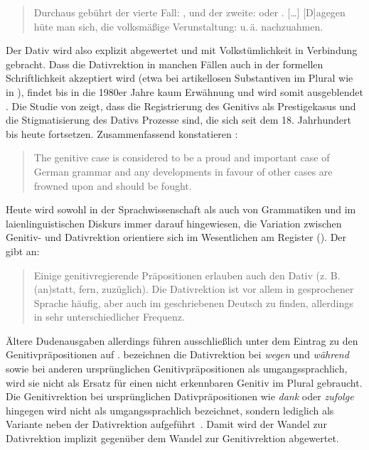\begin{quote} Durchaus gebührt  der vierte Fall: , und \wegen{} der zweite:  oder . […] [D]agegen hüte man sich, die volksmäßige Verunstaltung:  u.\,ä. nachzuahmen. \citep[141]{Matthias.1929} \end{quote}
Der Dativ wird also explizit abgewertet und mit Volkstümlichkeit in Verbindung gebracht. 
Dass die Dativrektion in manchen Fällen auch in der formellen Schriftlichkeit akzeptiert wird (etwa bei artikellosen Substantiven im Plural wie in ), findet bis in die 1980er Jahre kaum Erwähnung und wird somit ausgeblendet \citep[s.][205, 209]{Davies2006}. 
Die Studie von \citet[]{Davies2006} zeigt, dass die Registrierung des Genitivs als Prestigekasus und die Stigmatisierung des Dativs Prozesse sind, die sich seit dem 18. Jahrhundert bis heute fortsetzen. 
Zusammenfassend konstatieren \citeauthor{Davies2006}:\begin{quote}The genitive case is considered to be a proud and important case of German grammar and any developments in favour of other cases are frowned upon and should be fought. \citep[209]{Davies2006}\end{quote}
Heute wird sowohl in der Sprachwissenschaft als auch von Grammatiken und im laienlinguistischen Diskurs immer darauf hingewiesen, die Variation zwischen Genitiv- und Dativrektion orientiere sich im Wesentlichen am Register (\cites[s. etwa][172]{Barbour1998}[135]{Elter2005}[182]{Eisenberg.2013}).  
Der \citeauthor{Duden2022} gibt an: 
\begin{quote}Einige genitivregierende Präpositionen erlauben auch den Dativ (z. B. (an)statt, fern, zuzüglich). Die Dativrektion ist vor allem in gesprochener Sprache häufig, aber auch im geschriebenen Deutsch zu finden, allerdings in sehr unterschiedlicher Frequenz.~\citep[{\S}1450]{Duden2022}\end{quote}
Ältere Dudenausgaben allerdings führen \wegen{} ausschlie{\ss}lich unter dem Eintrag zu den Genitivpr{\"a}positionen auf \citep[s.][208]{Davies2006}. 
\citet[358]{Helbig.2017} bezeichnen die Dativrektion bei \textit{wegen }und \textit{w{\"a}hrend }sowie bei anderen urspr{\"u}nglichen Genitivpr{\"a}positionen als \glqq umgangssprachlich\grqq, wird sie nicht als Ersatz f{\"u}r einen nicht erkennbaren Genitiv im Plural gebraucht. 
Die Genitivrektion bei urspr{\"u}nglichen Dativpr{\"a}positionen wie \textit{dank }oder \textit{zufolge }hingegen wird nicht als umgangssprachlich bezeichnet, sondern lediglich als Variante neben der Dativrektion aufgef{\"u}hrt~\citep[s.][358]{Helbig.2017}. 
Damit wird der Wandel zur Dativrektion implizit gegenüber dem Wandel zur Genitivrektion abgewertet. 

